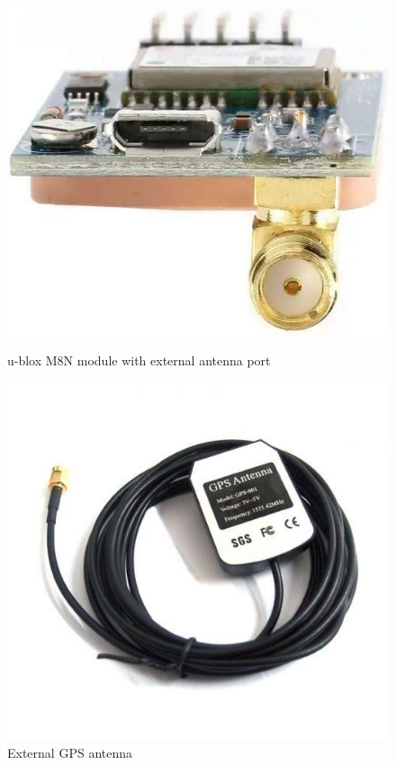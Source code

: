 \documentclass[
12pt,
oneside, 
onehalfspacing, 
nolistspacing, 
parskip, 
chapterinoneline, 
]{AASTCOMPUTER}
\begin{document}
\begin{figure}[!ht]
\centering
\begin{minipage}{0.45\textwidth}
  \centering
  \includegraphics[width=\linewidth]{Figures/Ha.png}
  \caption[u-blox M8N module with external antenna port]{u-blox M8N module with external antenna port}
  \label{fig:M8N specifications}
\end{minipage}\hfill
\begin{minipage}{0.45\textwidth}
  \centering
  \includegraphics[width=\linewidth]{Figures/13.png}
  \caption[External GPS antenna]{External GPS antenna}
  \label{fig:External GPS antenna}
\end{minipage}
\end{figure}
\end{document}
